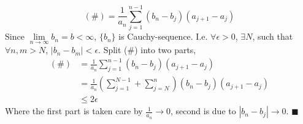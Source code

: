 \documentclass[a4paper,12pt,twoside]{book}
\begin{document}
\begin{itemize}
\begin{equation}
		(\#)=\frac{1}{a_n}\sum_{j=1}^{n-1}(b_n-b_j)(a_{j+1}-a_j)
	\end{equation}
	Since $\lim\limits_{n\rightarrow\infty}b_n = b< \infty$, $\{b_n\}$ is Cauchy-sequence. I.e. $\forall \epsilon>0$, $\exists N$, such that $\forall n, m>N$, $|b_n-b_m|<\epsilon$. Split (\#) into two parts,
	\begin{equation}
		\begin{split}
			(\#)&=\frac{1}{a_n}\sum_{j=1}^{n-1}(b_n-b_j)(a_{j+1}-a_j)\\
			&=\frac{1}{a_n}\left(\sum_{j=1}^{N-1}+\sum_{j=N}^n\right)(b_n-b_j)(a_{j+1}-a_j)\\
			&\leq 2\epsilon
		\end{split}
	\end{equation}
	Where the first part is taken care by $\frac{1}{a_n}\to 0$, second is due to $|b_n-b_j|\to 0$. $\blacksquare$
\end{itemize}

\end{document}
